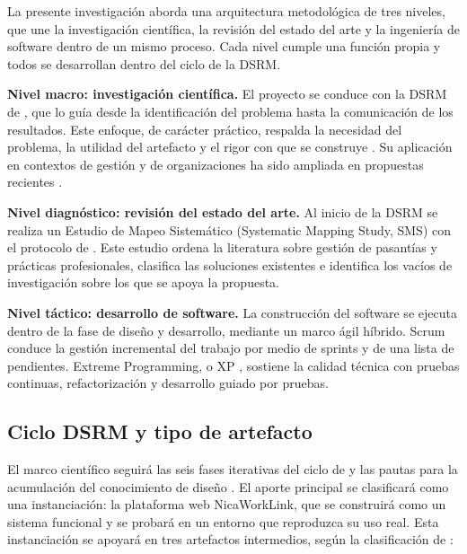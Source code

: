 La presente investigación aborda una arquitectura metodológica de tres niveles, que une la investigación científica, la revisión del estado del arte y la ingeniería de software dentro de un mismo proceso. Cada nivel cumple una función propia y todos se desarrollan dentro del ciclo de la DSRM.

\textbf{Nivel macro: investigación científica.} El proyecto se conduce con la DSRM de \textcite{peffers2007}, que lo guía desde la identificación del problema hasta la comunicación de los resultados. Este enfoque, de carácter práctico, respalda la necesidad del problema, la utilidad del artefacto y el rigor con que se construye \parencite{hevner2004,wieringa2014}. Su aplicación en contextos de gestión y de organizaciones ha sido ampliada en propuestas recientes \parencite{opdenakker2025}.

\textbf{Nivel diagnóstico: revisión del estado del arte.} Al inicio de la DSRM se realiza un Estudio de Mapeo Sistemático (Systematic Mapping Study, SMS) con el protocolo de \textcite{petersen2008}. Este estudio ordena la literatura sobre gestión de pasantías y prácticas profesionales, clasifica las soluciones existentes e identifica los vacíos de investigación sobre los que se apoya la propuesta.

\textbf{Nivel táctico: desarrollo de software.} La construcción del software se ejecuta dentro de la fase de diseño y desarrollo, mediante un marco ágil híbrido. Scrum \parencite{schwaber2020} conduce la gestión incremental del trabajo por medio de sprints y de una lista de pendientes. Extreme Programming, o XP \parencite{beck2000}, sostiene la calidad técnica con pruebas continuas, refactorización y desarrollo guiado por pruebas.

\subsection{Ciclo DSRM y tipo de artefacto}

El marco científico seguirá las seis fases iterativas del ciclo de \textcite{peffers2007} y las pautas para la acumulación del conocimiento de diseño \parencite{vombrocke2020,desordi2021}. El aporte principal se clasificará como una instanciación: la plataforma web NicaWorkLink, que se construirá como un sistema funcional y se probará en un entorno que reproduzca su uso real. Esta instanciación se apoyará en tres artefactos intermedios, según la clasificación de \textcite{hevner2004}:

